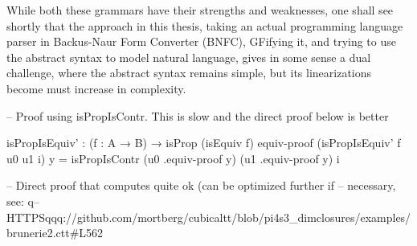 While both these grammars have their strengths and weaknesses, one shall see
shortly that the approach in this thesis, taking an actual programming language
parser in Backus-Naur Form Converter (BNFC), GFifying it, and trying to use the
abstract syntax to model natural language, gives in some sense a dual challenge,
where the abstract syntax remains simple, but its linearizations become
must increase in complexity.

-- Proof using isPropIsContr. This is slow and the direct proof below is better

isPropIsEquiv' : (f : A → B) → isProp (isEquiv f)
equiv-proof (isPropIsEquiv' f u0 u1 i) y =
  isPropIsContr (u0 .equiv-proof y) (u1 .equiv-proof y) i

-- Direct proof that computes quite ok (can be optimized further if
-- necessary, see:
q-- HTTPSqqq://github.com/mortberg/cubicaltt/blob/pi4s3_dimclosures/examples/brunerie2.ctt#L562








